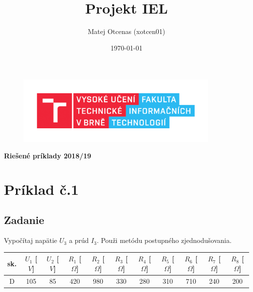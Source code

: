 \documentclass[a4paper,oneside,12pt]{article}
\author{Matej Otcenas (xotcen01)}
\date{\today}
\title{Projekt IEL}
\begin{document}
	\maketitle
	\newpage

\begin{figure}[h]
	\begin{center}
		\includegraphics[height = 96pt]{fit_pic.png}
	\end{center}
\end{figure}
	
	\tableofcontents
	\newpage
 	\begin{center}

	{\textbf{\LARGE Riešené príklady 2018/19}}
	
	\end{center}
	\maketitle
	\section{Príklad č.1}
	
	\maketitle
	\subsection{Zadanie}
	
	Vypočítaj napätie $U_3$ a prúd $I_3$. Použi metódu postupného zjednodušovania.
	
	
	\begin{table}[h]
		\begin{center}		
			\begin{tabular}{|c|c|c|c|c|c|c|c|c|c|c|}
					\hline
					sk. & $U_{1}$ [$V$] & $U_{2}$ [$V$] & $R_{1}$ [$\Omega$] &  $R_{2}$ [$\Omega$] & $R_{3}$ [$\Omega$] & $R_{4}$ [$\Omega$] & $R_{5}$ [$\Omega$] & $R_{6}$ [$\Omega$] & $R_{7}$ [$\Omega$] & $R_{8}$ [$\Omega$] \\
					\hline
					D & 105 & 85 & 420 & 980 & 330 & 280 & 310 & 710 & 240 & 200 \\
					\hline
			\end{tabular}
		\end{center}
	\end{table}
	
\end{document}
